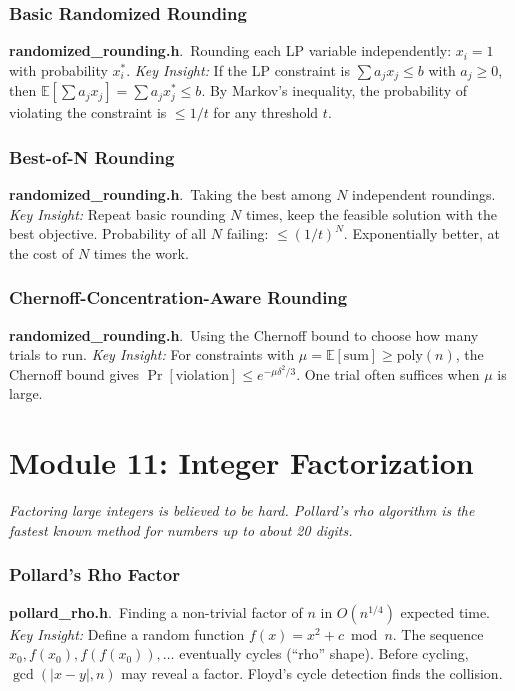 \documentclass[11pt,a4paper]{article}
\newcommand{\algo}[2]{\textbf{#1}.\ #2}
\newcommand{\insight}{\textit{Key Insight: }}
\begin{document}
\subsubsection{Basic Randomized Rounding}
\algo{randomized\_rounding.h}{Rounding each LP variable independently: \(x_i = 1\) with probability \(x_i^*\).}
\insight If the LP constraint is \(\sum a_j x_j \le b\) with \(a_j \ge 0\), then \(\mathbb{E}[\sum a_j x_j] = \sum a_j x_j^* \le b\). By Markov's inequality, the probability of violating the constraint is \(\le 1/t\) for any threshold \(t\).

\subsubsection{Best-of-N Rounding}
\algo{randomized\_rounding.h}{Taking the best among \(N\) independent roundings.}
\insight Repeat basic rounding \(N\) times, keep the feasible solution with the best objective. Probability of all \(N\) failing: \(\le (1/t)^N\). Exponentially better, at the cost of \(N\) times the work.

\subsubsection{Chernoff-Concentration-Aware Rounding}
\algo{randomized\_rounding.h}{Using the Chernoff bound to choose how many trials to run.}
\insight For constraints with \(\mu = \mathbb{E}[\text{sum}] \ge \text{poly}(n)\), the Chernoff bound gives \(\Pr[\text{violation}] \le e^{-\mu \delta^2 / 3}\). One trial often suffices when \(\mu\) is large.

\section{Module 11: Integer Factorization}
\label{sec:factor}

\textit{Factoring large integers is believed to be hard. Pollard's rho algorithm is the fastest known method for numbers up to about 20 digits.}

\subsubsection{Pollard's Rho Factor}
\algo{pollard\_rho.h}{Finding a non-trivial factor of \(n\) in \(O(n^{1/4})\) expected time.}
\insight Define a random function \(f(x) = x^2 + c \bmod n\). The sequence \(x_0, f(x_0), f(f(x_0)), \ldots\) eventually cycles (``rho'' shape). Before cycling, \(\gcd(|x - y|, n)\) may reveal a factor. Floyd's cycle detection finds the collision.
\end{document}
